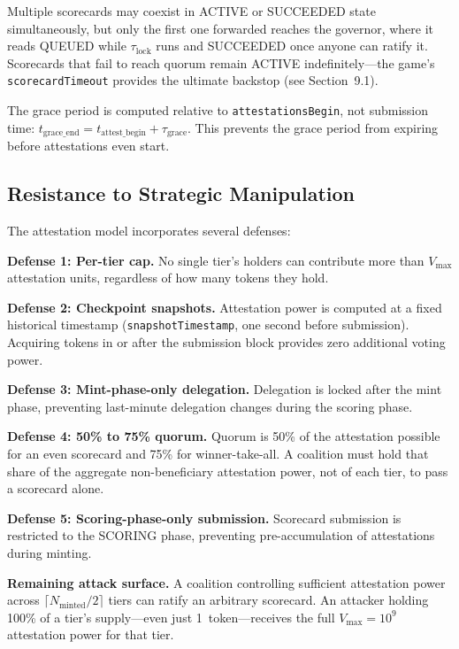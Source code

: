 \documentclass[11pt,a4paper]{article}
\begin{document}
Multiple scorecards may coexist in ACTIVE or SUCCEEDED state simultaneously, but only the first one forwarded reaches the governor, where it reads QUEUED while $\tau_{\text{lock}}$ runs and SUCCEEDED once anyone can ratify it. Scorecards that fail to reach quorum remain ACTIVE indefinitely---the game's \texttt{scorecardTimeout} provides the ultimate backstop (see Section~9.1).

The grace period is computed relative to \texttt{attestationsBegin}, not submission time: $t_{\text{grace\_end}} = t_{\text{attest\_begin}} + \tau_{\text{grace}}$. This prevents the grace period from expiring before attestations even start.

\subsection{Resistance to Strategic Manipulation}

The attestation model incorporates several defenses:

\textbf{Defense 1: Per-tier cap.} No single tier's holders can contribute more than $V_{\max}$ attestation units, regardless of how many tokens they hold.

\textbf{Defense 2: Checkpoint snapshots.} Attestation power is computed at a fixed historical timestamp (\texttt{snapshotTimestamp}, one second before submission). Acquiring tokens in or after the submission block provides zero additional voting power.

\textbf{Defense 3: Mint-phase-only delegation.} Delegation is locked after the mint phase, preventing last-minute delegation changes during the scoring phase.

\textbf{Defense 4: 50\% to 75\% quorum.} Quorum is 50\% of the attestation possible for an even scorecard and 75\% for winner-take-all. A coalition must hold that share of the aggregate non-beneficiary attestation power, not of each tier, to pass a scorecard alone.

\textbf{Defense 5: Scoring-phase-only submission.} Scorecard submission is restricted to the SCORING phase, preventing pre-accumulation of attestations during minting.

\textbf{Remaining attack surface.} A coalition controlling sufficient attestation power across $\lceil N_{\text{minted}}/2 \rceil$ tiers can ratify an arbitrary scorecard. An attacker holding 100\% of a tier's supply---even just 1~token---receives the full $V_{\text{max}} = 10^9$ attestation power for that tier.
\end{document}
